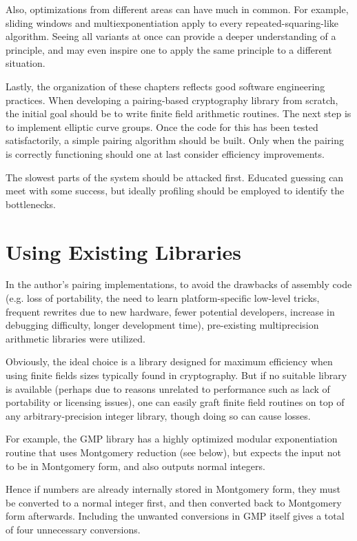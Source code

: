 Also, optimizations from different areas can have much in common. For example,
sliding windows and multiexponentiation apply to every repeated-squaring-like
algorithm. Seeing all variants at once can provide a deeper understanding of
a principle, and may even inspire one to apply the same principle to a
different situation.

Lastly, the organization of these chapters reflects good software
engineering practices. When developing a pairing-based cryptography
library from scratch,
the initial goal should be to write finite field arithmetic
routines. The next step is to implement elliptic curve groups.
Once the code for this has been tested satisfactorily, a simple
pairing algorithm should be built.
Only when the pairing is correctly functioning
should one at last consider efficiency improvements.

The slowest parts of the system should be attacked first.
Educated guessing can meet with some success, but
ideally profiling should be employed to identify the
bottlenecks.

\section{Using Existing Libraries}

In the author's pairing implementations, to avoid the drawbacks
of assembly code (e.g. loss of portability, the need to learn platform-specific
low-level tricks, frequent rewrites due to new hardware,
fewer potential developers, increase in debugging difficulty, longer
development time),
pre-existing multiprecision arithmetic libraries
were utilized.

Obviously, the ideal choice is
a library designed for maximum efficiency when using finite
fields sizes typically found in cryptography.
But if no suitable library is available (perhaps due to reasons unrelated
to performance such as lack of portability or licensing issues),
one can easily graft finite field routines on top of
any arbitrary-precision integer library, though doing so can cause losses.

For example, the GMP library has a highly optimized modular exponentiation
routine that uses Montgomery reduction (see below),
but expects the input not to be
in Montgomery form, and also outputs normal integers.

Hence if numbers are already internally stored in Montgomery form,
they must be converted to a normal integer first, and then converted
back to Montgomery form afterwards. Including the unwanted conversions in
GMP itself gives a total of four unnecessary conversions.

